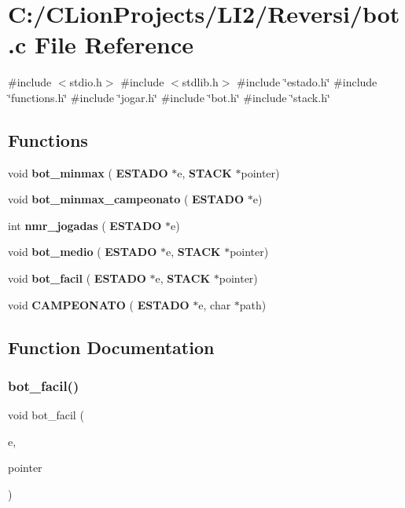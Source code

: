 \section{C\+:/\+C\+Lion\+Projects/\+L\+I2/\+Reversi/bot.c File Reference}
\label{bot_8c}
{\ttfamily \#include $<$stdio.\+h$>$}\newline
{\ttfamily \#include $<$stdlib.\+h$>$}\newline
{\ttfamily \#include \char`\"{}estado.\+h\char`\"{}}\newline
{\ttfamily \#include \char`\"{}functions.\+h\char`\"{}}\newline
{\ttfamily \#include \char`\"{}jogar.\+h\char`\"{}}\newline
{\ttfamily \#include \char`\"{}bot.\+h\char`\"{}}\newline
{\ttfamily \#include \char`\"{}stack.\+h\char`\"{}}\newline
\subsection*{Functions}
\begin{DoxyCompactItemize}
\item 
void \textbf{ bot\+\_\+minmax} (\textbf{ E\+S\+T\+A\+DO} $\ast$e, \textbf{ S\+T\+A\+CK} $\ast$pointer)
\item 
void \textbf{ bot\+\_\+minmax\+\_\+campeonato} (\textbf{ E\+S\+T\+A\+DO} $\ast$e)
\item 
int \textbf{ nmr\+\_\+jogadas} (\textbf{ E\+S\+T\+A\+DO} $\ast$e)
\item 
void \textbf{ bot\+\_\+medio} (\textbf{ E\+S\+T\+A\+DO} $\ast$e, \textbf{ S\+T\+A\+CK} $\ast$pointer)
\item 
void \textbf{ bot\+\_\+facil} (\textbf{ E\+S\+T\+A\+DO} $\ast$e, \textbf{ S\+T\+A\+CK} $\ast$pointer)
\item 
void \textbf{ C\+A\+M\+P\+E\+O\+N\+A\+TO} (\textbf{ E\+S\+T\+A\+DO} $\ast$e, char $\ast$path)
\end{DoxyCompactItemize}


\subsection{Function Documentation}
\mbox{\label{bot_8c_afedf7458980673bb5615796fa24897a9}} 
\subsubsection{bot\_facil()}
{\footnotesize\ttfamily void bot\+\_\+facil (\begin{DoxyParamCaption}\item[{\textbf{ E\+S\+T\+A\+DO} $\ast$}]{e,  }\item[{\textbf{ S\+T\+A\+CK} $\ast$}]{pointer }\end{DoxyParamCaption})}

